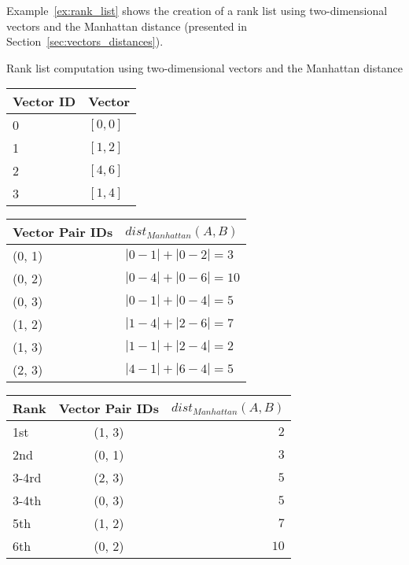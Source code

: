 Example~\ref{ex:rank_list} shows the creation of a rank list using two-dimensional vectors and the Manhattan distance (presented in Section~\ref{sec:vectors_distances}).

\begin{example}
  \centering
  \caption{Rank list computation using two-dimensional vectors and the Manhattan distance}
  \label{ex:rank_list}

  \begin{subexample}{\linewidth}
    \centering
    \begin{tabular}{l l}
      \toprule
      Vector ID & Vector \\
      \midrule
      0 & $[0, 0]$ \\
      1 & $[1, 2]$ \\
      2 & $[4, 6]$ \\
      3 & $[1, 4]$ \\
      \bottomrule
    \end{tabular}
  \end{subexample}

  \vspace{0.5cm}

  \begin{subexample}{\linewidth}
    \centering
    \begin{tabular}{l l}
      \toprule
      Vector Pair IDs & $dist_{Manhattan}(A, B)$ \\
      \midrule
      (0, 1) & $|0-1| + |0-2| = 3$ \\
      (0, 2) & $|0-4| + |0-6| = 10$ \\
      (0, 3) & $|0-1| + |0-4| = 5$ \\
      (1, 2) & $|1-4| + |2-6| = 7$ \\
      (1, 3) & $|1-1| + |2-4| = 2$ \\
      (2, 3) & $|4-1| + |6-4| = 5$ \\
      \bottomrule
    \end{tabular}
  \end{subexample}

  \vspace{0.5cm}

  \begin{subexample}{\linewidth}
    \centering
    \begin{tabular}{l c r}
      \toprule
      Rank & Vector Pair IDs & $dist_{Manhattan}(A, B)$ \\
      \midrule
      1st   & (1, 3) & $2$ \\
      2nd   & (0, 1) & $3$ \\
      3-4rd & (2, 3) & $5$ \\
      3-4th & (0, 3) & $5$ \\
      5th   & (1, 2) & $7$ \\
      6th   & (0, 2) & $10$ \\
      \bottomrule
    \end{tabular}
  \end{subexample}
\end{example}

